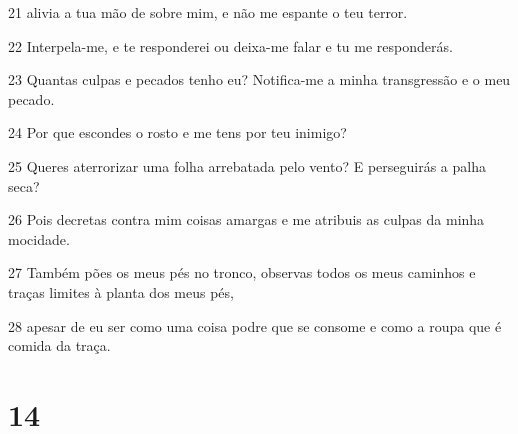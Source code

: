 \par 21 alivia a tua mão de sobre mim, e não me espante o teu terror.
\par 22 Interpela-me, e te responderei ou deixa-me falar e tu me responderás.
\par 23 Quantas culpas e pecados tenho eu? Notifica-me a minha transgressão e o meu pecado.
\par 24 Por que escondes o rosto e me tens por teu inimigo?
\par 25 Queres aterrorizar uma folha arrebatada pelo vento? E perseguirás a palha seca?
\par 26 Pois decretas contra mim coisas amargas e me atribuis as culpas da minha mocidade.
\par 27 Também pões os meus pés no tronco, observas todos os meus caminhos e traças limites à planta dos meus pés,
\par 28 apesar de eu ser como uma coisa podre que se consome e como a roupa que é comida da traça.

\chapter{14}

